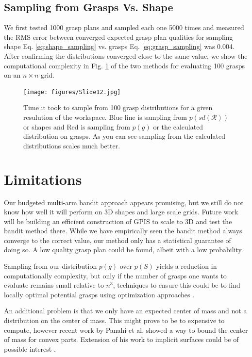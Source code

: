 \documentclass[letterpaper, 10 pt, conference]{ieeeconf}  %
\begin{document}
\subsection{Sampling from Grasps Vs. Shape}
We first tested 1000 grasp plans and sampled each one 5000 times  and measured the RMS error between converged expected grasp plan qualities for sampling shape Eq. \ref{eq:shape_sampling} vs. grasps  Eq. \ref{eq:grasp_sampling} was 0.004. After confirming the distributions converged close to the same value, we show the computational complexity in Fig. \ref{fig:speed_dif} of the two methods for evaluating 100 grasps on an $n \times n$ grid. 



\begin{figure}[ht!]
\centering
\texttt{[image: figures/Slide12.jpg]}
\caption{ \footnotesize Time it took to sample from 100 grasp distributions for a given resulution of the workspace. Blue line is sampling from $p(sd(\mathcal{R}))$ or shapes and Red is sampling from $p(g)$ or the calculated distribution on grasps. As you can see sampling from the calculated distributions scales much better. }
\vspace*{-10pt}
\label{fig:speed_dif}
\end{figure}

\section{Limitations} 

Our budgeted multi-arm bandit approach appears promising, but we still do not know how well it will perform on 3D shapes and large scale grids. Future work will be building an efficient construction of GPIS to scale to 3D and test the bandit method there. While we have empirically seen the bandit method always converge to the correct value, our method only has a statistical guarantee of doing so. A low quality grasp plan could be found, albeit with a low probability. 

Sampling from our distribution $p(g)$ over $p(S)$ yields a reduction in computationally complexity, but only if the number of grasps one wants to evaluate remains small relative to $n^3$, techniques to ensure this could be to find locally optimal potential grasps using optimization approaches \cite{mahler2015opt}. 

An additional problem is that we only have an expected center of mass and not a distribution on the center of mass. This might prove to be to expensive to compute, however recent work by Panahi et al. showed a way to bound the center of mass for convex parts. Extension of his work to implicit surfaces could be of possible interest \cite{panahi2014bounding}.  
\end{document}
